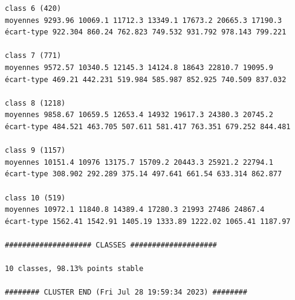 \documentclass[earth,article,submit,pdftex,moreauthors]{Definitions/mdpi}
\begin{document}
\begin{scriptsize}
\begin{verbatim}
class 6 (420)
moyennes 9293.96 10069.1 11712.3 13349.1 17673.2 20665.3 17190.3
écart-type 922.304 860.24 762.823 749.532 931.792 978.143 799.221

class 7 (771)
moyennes 9572.57 10340.5 12145.3 14124.8 18643 22810.7 19095.9
écart-type 469.21 442.231 519.984 585.987 852.925 740.509 837.032

class 8 (1218)
moyennes 9858.67 10659.5 12653.4 14932 19617.3 24380.3 20745.2
écart-type 484.521 463.705 507.611 581.417 763.351 679.252 844.481

class 9 (1157)
moyennes 10151.4 10976 13175.7 15709.2 20443.3 25921.2 22794.1
écart-type 308.902 292.289 375.14 497.641 661.54 633.314 862.877

class 10 (519)
moyennes 10972.1 11840.8 14389.4 17280.3 21993 27486 24867.4
écart-type 1562.41 1542.91 1405.19 1333.89 1222.02 1065.41 1187.97

#################### CLASSES ####################

10 classes, 98.13% points stable

######## CLUSTER END (Fri Jul 28 19:59:34 2023) ########

\end{verbatim}
\end{scriptsize}
\end{document}
